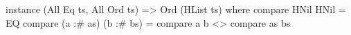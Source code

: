 \begin{code}
instance (All Eq ts, All Ord ts) => Ord (HList ts) where
  compare HNil HNil = EQ
  compare (a :# as) (b :# bs) =
    compare a b <> compare as bs
\end{code}
